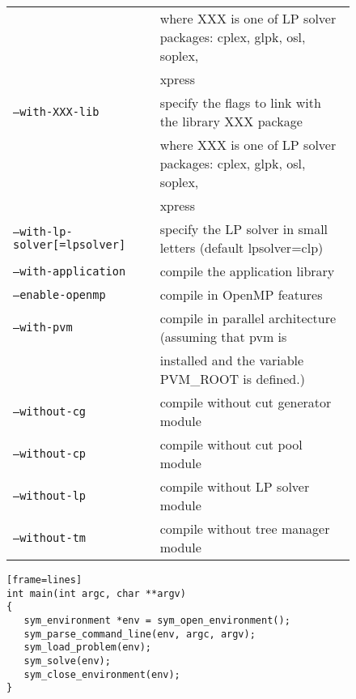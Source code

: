 \documentclass[twoside,11pt]{book}
\def\lthtmlcheckvsize{\ifdim\ht\sizebox<\vsize 
  \ifdim\wd\sizebox<\hsize\expandafter\hfill\fi \expandafter\vfill
  \else\expandafter\vss\fi}%
\begin{document}
{\begin{figure}
\begin{tabular}{ll}
&where XXX is one of LP solver packages: cplex, glpk, osl, soplex, \\
& xpress \\
\texttt{--with-XXX-lib} &  specify the flags to link with the library  
XXX package \\
&where XXX is one of LP solver packages: cplex, glpk, osl, soplex, \\
& xpress \\
\texttt{--with-lp-solver[=lpsolver]} &  specify the LP solver in small 
letters (default lpsolver=clp) \\
\texttt{--with-application} &  compile the application library \\
\hline
\texttt{--enable-openmp} &   compile in OpenMP features \\
\texttt{--with-pvm } &  compile in parallel architecture (assuming that pvm is \\
&installed and the variable PVM\_ROOT is defined.) \\
\texttt{--without-cg} &  compile without cut generator module \\
\texttt{--without-cp} &  compile without cut pool module \\
\texttt{--without-lp} &  compile without LP solver module \\
\texttt{--without-tm} &  compile without tree manager module
\end{tabular}

\end{figure}%
\lthtmlfigureZ
\lthtmlcheckvsize\clearpage}

{\newpage\clearpage
{}%
\begin{figure}{\color{brown}
\begin{Verbatim}
[frame=lines]
int main(int argc, char **argv)
{
   sym_environment *env = sym_open_environment();
   sym_parse_command_line(env, argc, argv);
   sym_load_problem(env);
   sym_solve(env);
   sym_close_environment(env);
}\end{Verbatim}

}

\end{figure}%
\lthtmlfigureZ
\lthtmlcheckvsize\clearpage}
\end{document}
